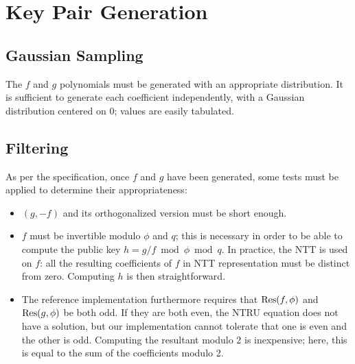 %
%

\section{Key Pair Generation}

\subsection{Gaussian Sampling}

The $f$ and $g$ polynomials must be generated with an appropriate
distribution. It is sufficient to generate each
coefficient independently, with a Gaussian distribution centered on 0;
values are easily tabulated.

\subsection{Filtering}

As per the \falcon specification, once $f$ and $g$ have been generated,
some tests must be applied to determine their appropriateness:
\begin{itemize}

  \item $(g, -f)$ and its orthogonalized version must be short
  enough.

  \item $f$ must be invertible modulo $\phi$ and $q$; this is necessary
  in order to be able to compute the public key $h = g/f \bmod \phi
  \bmod q$. In practice, the NTT is used on $f$: all the resulting
  coefficients of $f$ in NTT representation must be distinct from
  zero. Computing $h$ is then straightforward.

  \item The \falcon reference implementation furthermore requires that
  $\operatorname{Res}(f,\phi)$ and $\operatorname{Res}(g,\phi)$ be both odd. If they are both even,
  the NTRU equation does not have a solution, but our implementation
  cannot tolerate that one is even and the other is odd. Computing the
  resultant modulo 2 is inexpensive; here, this is equal
  to the sum of the coefficients modulo 2.

\end{itemize}


